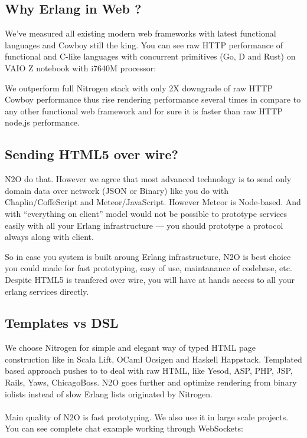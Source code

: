 \documentclass[11pt]{article}
\begin{document}
\subsection*{Why Erlang in Web ?}
We've measured all existing modern web frameworks with latest functional languages and Cowboy still the king.
You can see raw HTTP performance of functional and C-like languages with concurrent primitives (Go, D and Rust)
on VAIO Z notebook with i7640M processor:


We outperform full Nitrogen stack with only 2X downgrade of raw HTTP Cowboy
performance thus rise rendering performance several times in compare to
any other functional web framework and for sure it is faster than raw HTTP node.js performance.

\subsection*{Sending HTML5 over wire?}
N2O do that. However we agree that most advanced technology is to send
only domain data over network (JSON or Binary) like you do with Chaplin/CoffeScript and Meteor/JavaScript.
However Meteor is Node-based. And with ``everything on client'' model would not be
possible to prototype services easily with all your Erlang infrastructure --- you
should prototype a protocol always along with client.

So in case you system is built aroung Erlang infrastructure, N2O is best
choice you could made for fast prototyping, easy of use, maintanance of codebase, etc.
Despite HTML5 is tranfered over wire, you will have at hands access
to all your erlang services directly.

\subsection*{Templates vs DSL}
We choose Nitrogen for simple and elegant way of typed HTML page construction like 
in Scala Lift, OCaml Ocsigen and Haskell Happstack.
Templated based approach pushes to to deal with raw HTML, like 
Yesod, ASP, PHP, JSP, Rails, Yaws, ChicagoBoss.
N2O goes further and optimize rendering from binary iolists instead of slow Erlang
lists originated by Nitrogen.
\paragraph{}
Main quality of N2O is fast prototyping. We also use it in large scale projects.
You can see complete chat example working through WebSockets:
\end{document}
